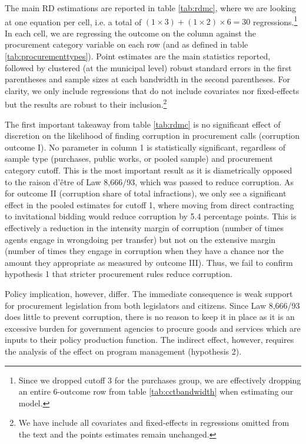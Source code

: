 \documentclass[11pt]{article}
\begin{document}
The main RD estimations are reported in table \ref{tab:rdmc}, where we are looking at one equation per cell, i.e. a total of $(1 \times 3) + (1 \times 2) \times 6 = 30$ regressions.\footnote{Since we dropped cutoff 3 for the purchases group, we are effectively dropping an entire 6-outcome row from table \ref{tab:cctbandwidth} when estimating our model.} In each cell, we are regressing the outcome on the column against the procurement category variable on each row (and as defined in table \ref{tab:procurementtypes}). Point estimates are the main statistics reported, followed by clustered (at the municipal level) robust standard errors in the first parentheses and sample sizes at each bandwidth in the second parentheses. For clarity, we only include regressions that do not include covariates nor fixed-effects but the results are robust to their inclusion.\footnote{We have include all covariates and fixed-effects in regressions omitted from the text and the points estimates remain unchanged.}

The first important takeaway from table \ref{tab:rdmc} is no significant effect of discretion on the likelihood of finding corruption in procurement calls (corruption outcome I). No parameter in column 1 is statistically significant, regardless of sample type (purchases, public works, or pooled sample) and procurement category cutoff. This is the most important result as it is diametrically opposed to the raison d'être of Law 8,666/93, which was passed to reduce corruption. As for outcome II (corruption share of total infractions), we only see a significant effect in the pooled estimates for cutoff 1, where moving from direct contracting to invitational bidding would reduce corruption by 5.4 percentage points. This is effectively a reduction in the intensity margin of corruption (number of times agents engage in wrongdoing per transfer) but not on the extensive margin (number of times they engage in corruption when they have a chance nor the amount they appropriate as measured by outcome III). Thus, we fail to confirm hypothesis 1 that stricter procurement rules reduce corruption.

Policy implication, however, differ. The immediate consequence is weak support for procurement legislation from both legislators and citizens. Since Law 8,666/93 does little to prevent corruption, there is no reason to keep it in place as it is an excessive burden for government agencies to procure goods and services which are inputs to their policy production function. The indirect effect, however, requires the analysis of the effect on program management (hypothesis 2).
\clearpage

\end{document}

